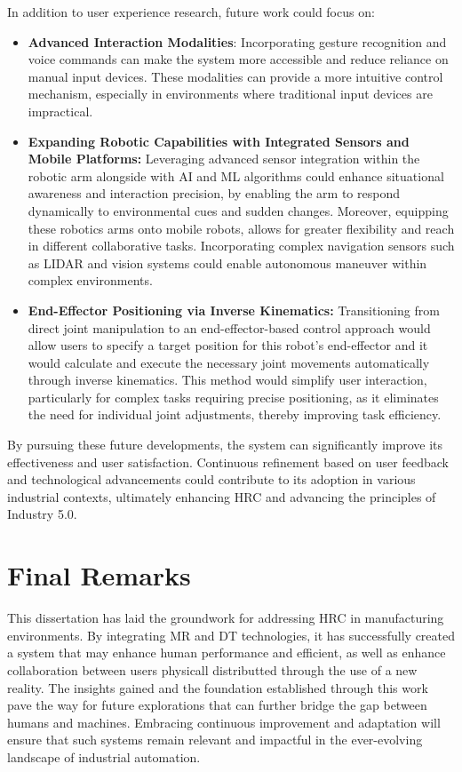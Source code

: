 In addition to user experience research, future work could focus on:

\begin{itemize} 

    \item \textbf{Advanced Interaction Modalities}: Incorporating gesture recognition and voice commands can make the system more accessible and reduce reliance on manual input devices. These modalities can provide a more intuitive control mechanism, especially in environments where traditional input devices are impractical.
    
    \item \textbf{Expanding Robotic Capabilities with Integrated Sensors and Mobile Platforms:} Leveraging advanced sensor integration within the robotic arm alongside with \ac{AI} and \ac{ML} algorithms could enhance situational awareness and interaction precision, by enabling the arm to respond dynamically to environmental cues and sudden changes. Moreover, equipping these robotics arms onto mobile robots, allows for greater flexibility and reach in different collaborative tasks. Incorporating complex navigation sensors such as \ac{LIDAR} and vision systems could enable autonomous maneuver within complex environments.

    \item \textbf{End-Effector Positioning via Inverse Kinematics:} Transitioning from direct joint manipulation to an end-effector-based control approach would allow users to specify a target position for this robot’s end-effector and it would calculate and execute the necessary joint movements automatically through inverse kinematics. This method would simplify user interaction, particularly for complex tasks requiring precise positioning, as it eliminates the need for individual joint adjustments, thereby improving task efficiency. 

\end{itemize}

By pursuing these future developments, the system can significantly improve its effectiveness and user satisfaction. Continuous refinement based on user feedback and technological advancements could contribute to its adoption in various industrial contexts, ultimately enhancing \ac{HRC} and advancing the principles of Industry 5.0.

\section{Final Remarks}

This dissertation has laid the groundwork for addressing \ac{HRC} in manufacturing environments. By integrating \ac{MR} and \ac{DT} technologies, it has successfully created a system that may enhance human performance and efficient, as well as enhance collaboration between users physicall distributted through the use of a new reality. The insights gained and the foundation established through this work pave the way for future explorations that can further bridge the gap between humans and machines. Embracing continuous improvement and adaptation will ensure that such systems remain relevant and impactful in the ever-evolving landscape of industrial automation.